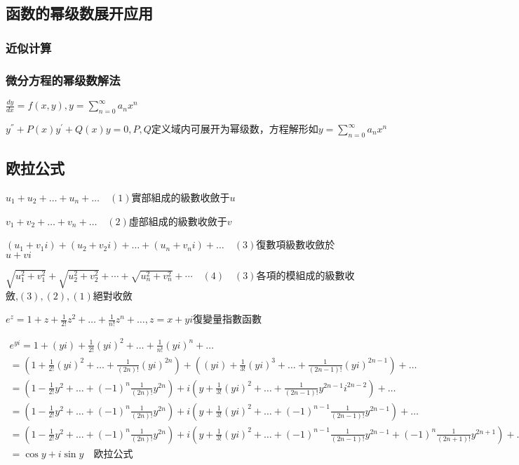 \documentclass[UTF8]{ctexart}
\newcommand{\mt}[1]{\text{#1}}
\newcommand{\mf}[1]{\left( #1\right)}
\newcommand{\q}{\quad}
\newcommand{\ma}[1]{\begin{array}{llll} #1 \end{array}}
\newcommand{\jisu}[1]{\sum_{n=0}^\infty #1}
\begin{document}
\subsection{函数的幂级数展开应用 }

\subsubsection{近似计算 }

\subsubsection{微分方程的幂级数解法 }

$\frac{dy}{dx}=f\mf{x,y},y=\jisu{a_nx^n}$

$y^{''}+P\mf{x}y^{'}+Q\mf{x}y=0,P,Q\mt{定义域内可展开为幂级数，方程解形如}y=\jisu{a_nx^n}$


\subsection{欧拉公式 }




$ u_1+u_2+\dots+u_n+\dots  \q \mf{1}$實部組成的級數收斂于$u$

$v_1+v_2+\dots+v_n+\dots  \q \mf{2}$虛部組成的級數收斂于$v$

$\mf{u_1+v_1i}+\mf{u_2+v_2i}+\dots+\mf{u_n+v_ni}+\dots  \q \mf{3}$復數項級數收斂於$u+vi$

$\sqrt{u_1^2+v_1^2}+\sqrt{u_2^2+v_2^2}+\cdots+\sqrt{u_n^2+v_n^2}+\cdots \q \mf{4} \q \mf{3}$各項的模組成的級數收斂,$\mf{3},\mf{2},\mf{1}$絕對收斂
 


$e^z=1+z+\frac{1}{2!}z^2+\dots+\frac{1}{n!}z^n+\dots,z=x+yi$復變量指數函數

$\ma{e^{yi}=1+\mf{yi}+\frac{1}{2!}\mf{yi}^2+\dots+\frac{1}{n!}\mf{yi}^n+\dots\\
    =\mf{1+\frac{1}{2!}\mf{yi}^2+\dots+ \frac{1}{\mf{2n}!}\mf{yi}^{2n}}+\mf{\mf{yi}+\frac{1}{3!}\mf{yi}^3+\dots+ \frac{1}{\mf{2n-1}!}\mf{yi}^{2n-1}}+\dots\\
    =\mf{1-\frac{1}{2!}y^2+\dots+ \mf{-1}^n\frac{1}{\mf{2n}!}y^{2n}}+
    i\mf{y+\frac{1}{3!}\mf{yi}^2+\dots+ \frac{1}{\mf{2n-1}!}y^{2n-1}i^{2n-2}}+\dots\\
    =\mf{1-\frac{1}{2!}y^2+\dots+ \mf{-1}^n\frac{1}{\mf{2n}!}y^{2n}}+
    i\mf{y+\frac{1}{3!}\mf{yi}^2+\dots+ \mf{-1}^{n-1}\frac{1}{\mf{2n-1}!}y^{2n-1}}+\dots\\
    =\mf{1-\frac{1}{2!}y^2+\dots+ \mf{-1}^n\frac{1}{\mf{2n}!}y^{2n}}+
    i\mf{y+\frac{1}{3!}\mf{yi}^2+\dots+ \mf{-1}^{n-1}\frac{1}{\mf{2n-1}!}y^{2n-1}+ \mf{-1}^{n}\frac{1}{\mf{2n+1}!}y^{2n+1}}+\dots\\
    =\cos y + i \sin y \q \mt{欧拉公式}\\
}$
\end{document}
